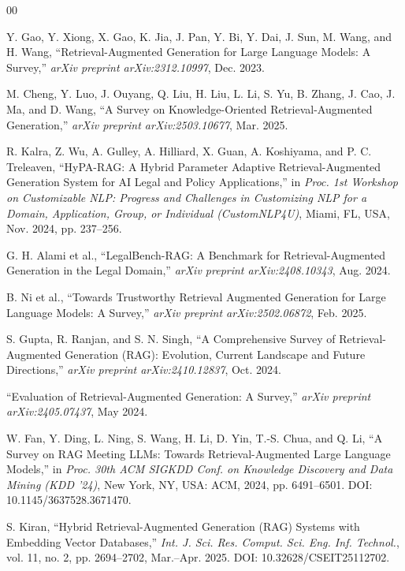 \documentclass[conference]{IEEEtran}
\begin{document}
\begin{thebibliography}{00}

 Y. Gao, Y. Xiong, X. Gao, K. Jia, J. Pan, Y. Bi, Y. Dai, J. Sun, M. Wang, and H. Wang, ``Retrieval-Augmented Generation for Large Language Models: A Survey,'' \textit{arXiv preprint arXiv:2312.10997}, Dec. 2023.

 M. Cheng, Y. Luo, J. Ouyang, Q. Liu, H. Liu, L. Li, S. Yu, B. Zhang, J. Cao, J. Ma, and D. Wang, ``A Survey on Knowledge-Oriented Retrieval-Augmented Generation,'' \textit{arXiv preprint arXiv:2503.10677}, Mar. 2025.

 R. Kalra, Z. Wu, A. Gulley, A. Hilliard, X. Guan, A. Koshiyama, and P. C. Treleaven, ``HyPA-RAG: A Hybrid Parameter Adaptive Retrieval-Augmented Generation System for AI Legal and Policy Applications,'' in \textit{Proc. 1st Workshop on Customizable NLP: Progress and Challenges in Customizing NLP for a Domain, Application, Group, or Individual (CustomNLP4U)}, Miami, FL, USA, Nov. 2024, pp. 237--256.

 G. H. Alami et al., ``LegalBench-RAG: A Benchmark for Retrieval-Augmented Generation in the Legal Domain,'' \textit{arXiv preprint arXiv:2408.10343}, Aug. 2024.

 B. Ni et al., ``Towards Trustworthy Retrieval Augmented Generation for Large Language Models: A Survey,'' \textit{arXiv preprint arXiv:2502.06872}, Feb. 2025.

 S. Gupta, R. Ranjan, and S. N. Singh, ``A Comprehensive Survey of Retrieval-Augmented Generation (RAG): Evolution, Current Landscape and Future Directions,'' \textit{arXiv preprint arXiv:2410.12837}, Oct. 2024.

 ``Evaluation of Retrieval-Augmented Generation: A Survey,'' \textit{arXiv preprint arXiv:2405.07437}, May 2024.

 W. Fan, Y. Ding, L. Ning, S. Wang, H. Li, D. Yin, T.-S. Chua, and Q. Li, ``A Survey on RAG Meeting LLMs: Towards Retrieval-Augmented Large Language Models,'' in \textit{Proc. 30th ACM SIGKDD Conf. on Knowledge Discovery and Data Mining (KDD '24)}, New York, NY, USA: ACM, 2024, pp. 6491--6501. DOI: 10.1145/3637528.3671470.

 S. Kiran, ``Hybrid Retrieval-Augmented Generation (RAG) Systems with Embedding Vector Databases,'' \textit{Int. J. Sci. Res. Comput. Sci. Eng. Inf. Technol.}, vol. 11, no. 2, pp. 2694--2702, Mar.--Apr. 2025. DOI: 10.32628/CSEIT25112702.


\end{thebibliography}
\end{document}
